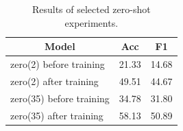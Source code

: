 \begin{table}[!h]
\centering
\begin{tabular}{|l|l|l|}
\hline
\multicolumn{1}{|c|}{Model} & \multicolumn{1}{c|}{Acc} & \multicolumn{1}{c|}{F1} \\ \hline
zero(2) before training     & 21.33                    & 14.68                   \\ \hline
zero(2) after training      & 49.51                    & 44.67                   \\ \hline
zero(35) before training    & 34.78                    & 31.80                   \\ \hline
zero(35) after training     & 58.13                    & 50.89                   \\ \hline
\end{tabular}
\caption{Results of selected zero-shot experiments.}
\label{tab:zero}
\end{table}


 
















